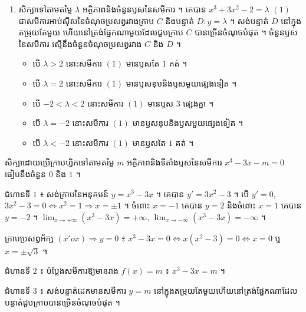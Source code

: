 \begin{enumerate}[a]
  \item សិក្សាទៅតាមតម្លៃ $\lambda$ អត្ថិភាពនិងចំនួនឫសនៃសមីការ ។ គេបាន $x^3 + 3x^2 - 2 = \lambda$ $(1)$ ជាសមីការអាប់ស៊ីសនៃចំណុចប្រសព្វរវាងក្រាប $C$ និងបន្ទាត់ $D : y = \lambda$ ។ សង់បន្ទាត់ $D$ នៅក្នុងតម្រុយតែមួយ ហើយនៅត្រង់ផ្នែកណាមួយដែលជួបក្រាប $C$ បានច្រើនចំណុចបំផុត ។ ចំនួនឫសនៃសមីការ ស្មើនឹងចំនួនចំណុចប្រសព្វរវាង $C$ និង $D$ ។
  \begin{itemize}
    \item បើ $\lambda > 2$ នោះសមីការ $(1)$ មានឫសតែ $1$ គត់ ។
    \item បើ $\lambda = 2$ នោះសមីការ $(1)$ មានឫសឌុបនិងឫសមួយផ្សេងទៀត ។
    \item បើ $-2 < \lambda < 2$ នោះសមីការ $(1)$ មានឫស $3$ ផ្សេងគ្នា ។
    \item បើ $\lambda = -2$ នោះសមីការ $(1)$ មានឫសឌុបនិងឫសមួយផ្សេងទៀត ។
    \item បើ $\lambda < -2$ នោះសមីការ $(1)$ មានឫសតែ $1$ គត់ ។
  \end{itemize}
\end{enumerate}

\begin{example}[លំហាត់គំរូ]
សិក្សាដោយប្រើក្រាបហ្វិកទៅតាមតម្លៃ $m$ អត្ថិភាពនិងទីតាំងឫសនៃសមីការ $x^3 - 3x - m = 0$ ធៀបនឹងចំនួន $0$ និង $1$ ។
\end{example}
\ans
ជំហានទី $1$ ៖ សង់ក្រាបនៃអនុគមន៍ $y = x^3 - 3x$ ។ គេបាន $y' = 3x^2 - 3$ ។ បើ $y' = 0$, $3x^2 - 3 = 0 \Leftrightarrow x^2 = 1 \Rightarrow x = \pm 1$ ។ ចំពោះ $x = -1$ គេបាន $y = 2$ និងចំពោះ $x = 1$ គេបាន $y = -2$ ។ $\displaystyle\lim_{x \to +\infty}(x^3 - 3x) = +\infty$, $\displaystyle\lim_{x \to -\infty}(x^3 - 3x) = -\infty$ ។
\begin{center}
\end{center}
ក្រាបប្រសព្វអ័ក្ស $(x'ox) \Rightarrow y = 0$ ៖ $x^3 - 3x = 0 \Leftrightarrow x(x^2 - 3) = 0 \Leftrightarrow x = 0$ ឬ $x = \pm\sqrt{3}$ ។

ជំហានទី $2$ ៖ បំប្លែងសមីការឱ្យមានរាង $f(x) = m$ ៖ $x^3 - 3x = m$ ។

ជំហានទី $3$ ៖ សង់បន្ទាត់ដេកមានសមីការ $y = m$ នៅក្នុងតម្រុយតែមួយហើយនៅត្រង់ផ្នែកណាដែលបន្ទាត់ជួបក្រាបបានច្រើនចំណុចបំផុត ។

\begin{center}
\end{center}

